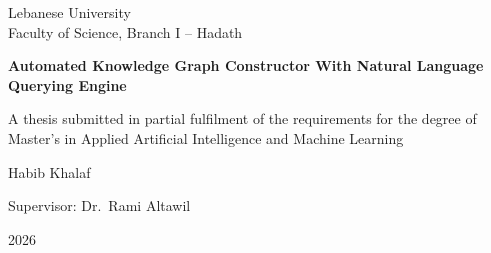 \begin{titlepage}
\centering
{\large Lebanese University\\ Faculty of Science, Branch I -- Hadath\par}
\vspace{2cm}
{\LARGE\bfseries Automated Knowledge Graph Constructor With Natural Language Querying Engine\par}
\vspace{1.5cm}
{\large A thesis submitted in partial fulfilment of the requirements for the degree of\\
Master's in Applied Artificial Intelligence and Machine Learning\par}
\vspace{1.5cm}
{\large Habib Khalaf\par}
\vspace{1cm}
{\large Supervisor: Dr.~Rami Altawil\par}
\vfill
{\large 2026\par}
\end{titlepage}
